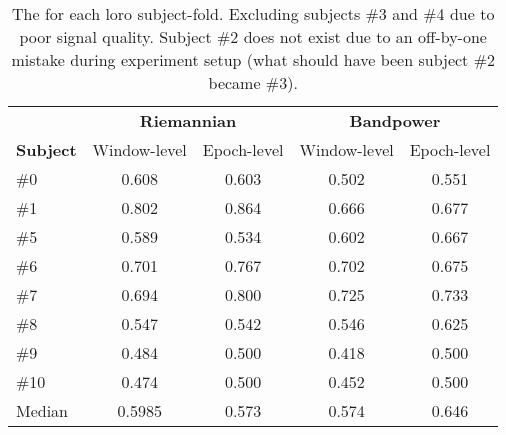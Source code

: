 \begin{table}[h]
    \centering
    \begin{tabular}{lcccc}
        \toprule
        & \multicolumn{2}{c}{\textbf{Riemannian}} & \multicolumn{2}{c}{\textbf{Bandpower}} \\
        \cmidrule(lr){2-3}
        \cmidrule(lr){4-5}
        \textbf{Subject} & Window-level & Epoch-level & Window-level & Epoch-level \\
        \midrule
        \#0  & 0.608 & 0.603 & 0.502 & 0.551 \\
        \#1  & 0.802 & 0.864 & 0.666 & 0.677 \\
        \#5  & 0.589 & 0.534 & 0.602 & 0.667 \\
        \#6  & 0.701 & 0.767 & 0.702 & 0.675 \\
        \#7  & 0.694 & 0.800 & 0.725 & 0.733 \\
        \#8  & 0.547 & 0.542 & 0.546 & 0.625 \\
        \#9  & 0.484 & 0.500 & 0.418 & 0.500 \\
        \#10 & 0.474 & 0.500 & 0.452 & 0.500 \\
        \midrule
        Median & 0.5985 & 0.573 & 0.574 & 0.646 \\
        \bottomrule
    \end{tabular}
    \caption{The  for each \gls{loro} subject-fold. Excluding subjects \#3 and \#4 due to poor signal quality. Subject \#2 does not exist due to an off-by-one mistake during experiment setup (what should have been subject \#2 became \#3).}\label{table:bac-all}
\end{table}
